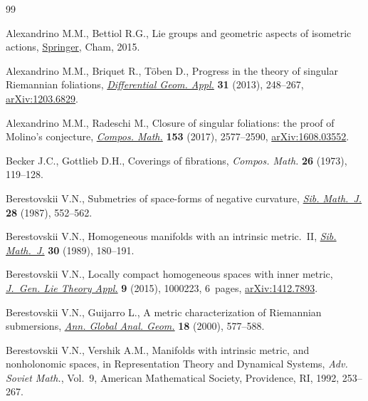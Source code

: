 \documentclass[pdftex]{sigma}
\numberwithin{equation}{section}
\theoremstyle{definition}
\begin{document}
\begin{thebibliography}{99}
\footnotesize\itemsep=0pt

Alexandrino M.M., Bettiol R.G., Lie groups and geometric aspects of isometric
 actions, \href{https://doi.org/10.1007/978-3-319-16613-1}{Springer}, Cham,
 2015.

Alexandrino M.M., Briquet R., T\"oben D., Progress in the theory of singular
 {R}iemannian foliations,
 \href{https://doi.org/10.1016/j.difgeo.2013.01.004}{\textit{Differential
 Geom. Appl.}} \textbf{31} (2013), 248--267,
 \href{http://arxiv.org/abs/1203.6829}{arXiv:1203.6829}.

Alexandrino M.M., Radeschi M., Closure of singular foliations: the proof of
 {M}olino's conjecture,
 \href{https://doi.org/10.1112/S0010437X17007485}{\textit{Compos. Math.}}
 \textbf{153} (2017), 2577--2590,
 \href{http://arxiv.org/abs/1608.03552}{arXiv:1608.03552}.

Becker J.C., Gottlieb D.H., Coverings of fibrations, \textit{Compos. Math.}
 \textbf{26} (1973), 119--128.

Berestovskii V.N., Submetries of space-forms of negative curvature,
 \href{https://doi.org/10.1007/BF00973842}{\textit{Sib. Math.~J.}} \textbf{28}
 (1987), 552--562.

Berestovskii V.N., Homogeneous manifolds with an intrinsic metric.~{II},
 \href{https://doi.org/10.1007/BF00971372}{\textit{Sib. Math.~J.}} \textbf{30}
 (1989), 180--191.

Berestovskii V.N., Locally compact homogeneous spaces with inner metric,
 \href{https://doi.org/10.4172/1736-4337.1000223}{\textit{J.~Gen. Lie Theory
 Appl.}} \textbf{9} (2015), 1000223, 6~pages,
 \href{http://arxiv.org/abs/1412.7893}{arXiv:1412.7893}.

Berestovskii V.N., Guijarro L., A metric characterization of {R}iemannian
 submersions, \href{https://doi.org/10.1023/A:1006683922481}{\textit{Ann.
 Global Anal. Geom.}} \textbf{18} (2000), 577--588.

Berestovskii V.N., Vershik A.M., Manifolds with intrinsic metric, and
 nonholonomic spaces, in Representation {T}heory and {D}ynamical {S}ystems,
 \textit{Adv. Soviet Math.}, Vol.~9, American Mathematical Society,
 Providence, RI, 1992, 253--267.


\end{thebibliography}
\end{document}
